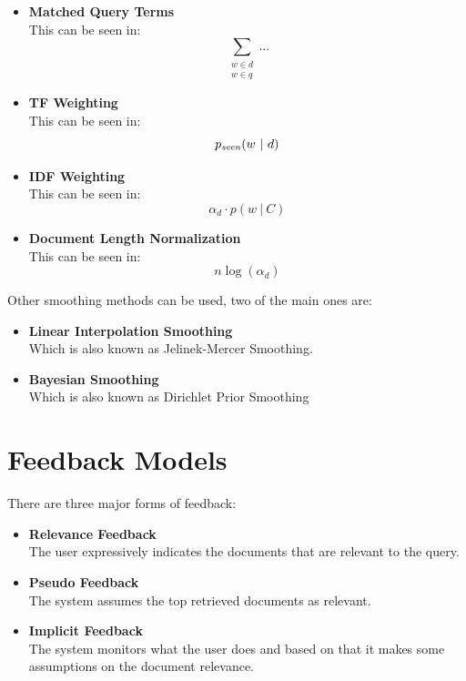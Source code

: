 \documentclass{article}
\begin{document}
\begin{itemize}
	\item \textbf{Matched Query Terms}
	\vspace{.2cm} \\
	This can be seen in:
	\[  \sum_{\substack{w \in d \\ w \in q}} ... \]
	
	\item \textbf{TF Weighting}
	\vspace{.2cm} \\
	This can be seen in:
	\[ p_\text{\textit{seen}}(w~|~d) \]
	
	\item \textbf{IDF Weighting}
	\vspace{.2cm} \\
	This can be seen in:
	\[ \alpha_d \cdot p(w~|~C) \]
	
	\item \textbf{Document Length Normalization}
	\vspace{.2cm} \\
	This can be seen in:
	\[ n \log (\alpha_d) \]
\end{itemize}
Other smoothing methods can be used, two of the main ones are:

\begin{itemize}
	\item \textbf{Linear Interpolation Smoothing}
	\vspace{.2cm} \\ 
	Which is also known as Jelinek-Mercer Smoothing.
	
	\item \textbf{Bayesian Smoothing}
	\vspace{.2cm} \\
	Which is also known as Dirichlet Prior Smoothing
\end{itemize}

\section{Feedback Models}
There are three major forms of feedback:

\begin{itemize}
	\item \textbf{Relevance Feedback}
	\vspace{.2cm} \\
	The user expressively indicates the documents that are relevant to the query.
	
	\item \textbf{Pseudo Feedback}
	\vspace{.2cm} \\
	The system assumes the top retrieved documents as relevant.
	
	\item \textbf{Implicit Feedback}
	\vspace{.2cm} \\
	The system monitors what the user does and based on that it makes some assumptions on the document relevance.
\end{itemize}
\end{document}
